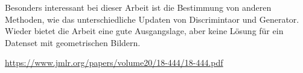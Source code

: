 Besonders interessant bei dieser Arbeit ist die Bestimmung von anderen Methoden, wie das unterschiedliche Updaten von Discrimintaor und Generator.
Wieder bietet die Arbeit eine gute Ausgangslage, aber keine Lösung für ein Datenset mit geometrischen Bildern.

\url{https://www.jmlr.org/papers/volume20/18-444/18-444.pdf}

